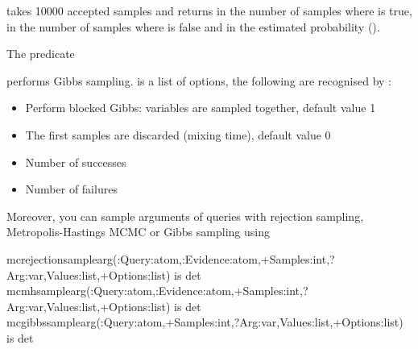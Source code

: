\documentclass[letterpaper,10pt,english]{sphinxmanual}
\begin{document}
takes 10000 accepted samples and returns in  the number of samples where  is true,
in  the number of samples where  is false and in  the estimated probability ().

The predicate

\begin{sphinxVerbatim}[commandchars=\\\{\}]
  
\end{sphinxVerbatim}

performs Gibbs sampling.  is a list of options, the following are recognised by :
\begin{itemize}
\item {} 
 Perform blocked Gibbs:  variables are sampled together, default value 1

\item {} 
 The first  samples are discarded (mixing time), default value 0

\item {} 
 Number of successes

\item {} 
 Number of failures

\end{itemize}

Moreover, you can sample arguments of queries with rejection sampling, Metropolis-Hastings MCMC or Gibbs sampling using

\begin{sphinxVerbatim}[commandchars=\\\{\}]
mc\PYGZus{}rejection\PYGZus{}sample\PYGZus{}arg(:Query:atom,:Evidence:atom,+Samples:int,?Arg:var,\PYGZhy{}Values:list,+Options:list) is det
mc\PYGZus{}mh\PYGZus{}sample\PYGZus{}arg(:Query:atom,:Evidence:atom,+Samples:int,?Arg:var,\PYGZhy{}Values:list,+Options:list) is det
mc\PYGZus{}gibbs\PYGZus{}sample\PYGZus{}arg(:Query:atom,+Samples:int,?Arg:var,\PYGZhy{}Values:list,+Options:list) is det
\end{sphinxVerbatim}
\end{document}
